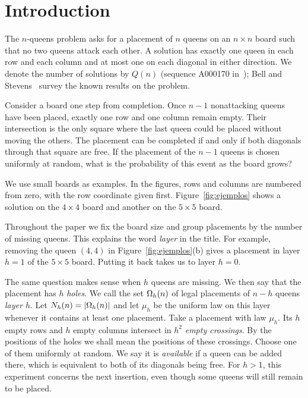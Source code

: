 \section{Introduction}\label{sec:intro}

The $n$-queens problem asks for a placement of $n$ queens on an $n\times n$ board such that no two queens
attack each other. A solution
has exactly one queen in each row and each column and at most one on each diagonal in either direction. We
denote the number of
solutions by $Q(n)$ (sequence A000170 in~\cite{OEIS}); Bell and Stevens~\cite{BellStevens} survey the known
results on the
problem.

Consider a board one step from completion. Once $n-1$ nonattacking queens have been placed, exactly one row
and one column remain
empty. Their intersection is the only square where the last queen could be placed without moving the others.
The placement can be
completed if and only if both diagonals through that square are free. If the placement of the $n-1$ queens
is chosen uniformly at
random, what is the probability of this event as the board grows?

We use small boards as examples. In the figures, rows and columns are numbered from zero, with the row
coordinate given first.
Figure~\ref{fig:ejemplos} shows a solution on the $4\times4$ board and another on the $5\times5$ board.



Throughout the paper we fix the board size and group placements by the number of missing queens. This
explains the word \emph{layer} in
the title. For example, removing the queen $(4,4)$ in Figure~\ref{fig:ejemplos}(b) gives a placement in
layer $h=1$ of the $5\times5$ board.
Putting it back takes us to layer $h=0$.

The same question makes sense when $h$ queens are missing. We then say that the placement has $h$
\emph{holes}. We call the set
$\Omega_h(n)$ of legal placements of $n-h$ queens \emph{layer $h$}. Let $N_h(n)=|\Omega_h(n)|$ and let $\mu_h$ be
the uniform law on this
layer whenever it contains at least one placement. Take a placement with law $\mu_h$. Its $h$ empty rows and
$h$ empty columns
intersect in $h^2$ \emph{empty crossings}. By the positions of the holes we shall mean the positions of
these crossings. Choose one of them
uniformly at random. We say it is \emph{available} if a queen can be added there, which is equivalent to
both of its diagonals being
free. For $h>1$, this experiment concerns the next insertion, even though some queens will still remain to
be placed.

